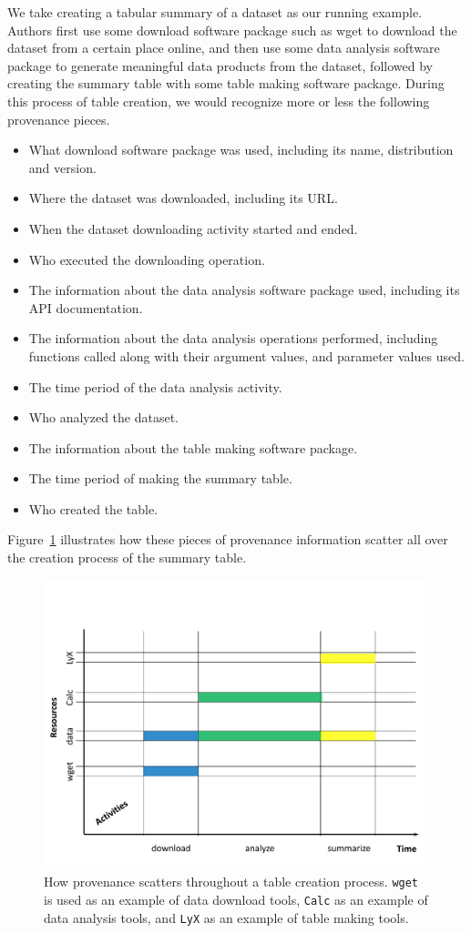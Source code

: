 We take creating a tabular summary of a dataset as our running example. Authors first use some 
download software package such as wget to download the dataset from a certain place online, and then 
use some data analysis software package to generate meaningful data products from the dataset, 
followed by creating the summary table with some table making software package. During this process 
of table creation, we would recognize more or less the following provenance pieces.
\begin{itemize}
\item What download software package was used, including its name, distribution and version.
\item Where the dataset was downloaded, including its URL.
\item When the dataset downloading activity started and ended.
\item Who executed the downloading operation.
\item The information about the data analysis software package used, including its API documentation.
\item The information about the data analysis operations performed, including functions called along 
with their argument values, and parameter values used. 
\item The time period of the data analysis activity.
\item Who analyzed the dataset.
\item The information about the table making software package.
\item The time period of making the summary table.
\item Who created the table.
\end{itemize}
Figure~\ref{prov-pieces} illustrates how these pieces of provenance information scatter all over the 
creation process of the summary table.
\begin{figure}
\centering
\includegraphics[scale=0.5]{prov-pieces}
\caption[Provenance for the creation of a table]{How provenance scatters throughout a table creation process. \texttt{wget} is used as an example of data download tools, \texttt{Calc} as an example of data analysis tools, and \texttt{LyX} as an example of table making tools.}
\label{prov-pieces}
\end{figure}

